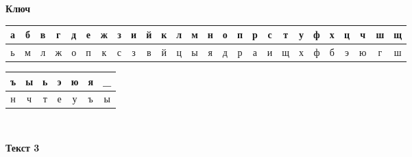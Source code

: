 \documentclass[a4paper,14pt]{extarticle}
\begin{document}
    \begin{center}
        \textbf{Ключ}
    \end{center}
    \vspace{-3em}
    \begin{center}
        \begin{tabular}{|c|c|c|c|c|c|c|c|c|c|c|c|c|c|c|c|c|c|c|c|c|c|c|c|c|c|}
            \hline
            а & б & в & г & д & е & ж & з & и & й & к & л & м & н & о & п & р & с & т & у & ф & х & ц & ч & ш & щ  \\
            \hline
            ь & м & л & ж & о & п & к & с & з & в & й & ц & ы & я & д & р & а & и & щ & х & ф & б & э & ю & г & ш   \\
            \hline
        \end{tabular}
    \end{center}
    \begin{tabular}{|c|c|c|c|c|c|c|}
        \hline
        ъ & ы & ь & э & ю & я & \_ \\
        \hline
        н & ч & т & е & у & ъ & ы \\
        \hline
    \end{tabular}\\

    \newpage
    \begin{center}
        \textbf{Текст 3}
    \end{center}
\end{document}
